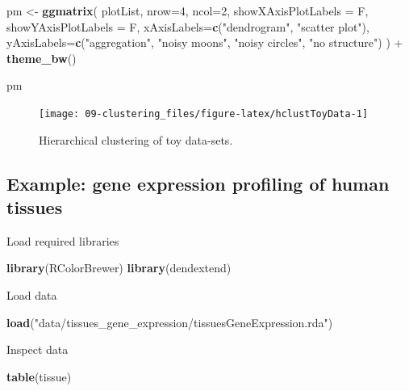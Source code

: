 \documentclass[]{book}
\newenvironment{Shaded}{\begin{snugshade}}{\end{snugshade}}
\newcommand{\KeywordTok}[1]{\textcolor[rgb]{0.13,0.29,0.53}{\textbf{{#1}}}}
\newcommand{\DataTypeTok}[1]{\textcolor[rgb]{0.13,0.29,0.53}{{#1}}}
\newcommand{\DecValTok}[1]{\textcolor[rgb]{0.00,0.00,0.81}{{#1}}}
\newcommand{\StringTok}[1]{\textcolor[rgb]{0.31,0.60,0.02}{{#1}}}
\newcommand{\NormalTok}[1]{{#1}}
\theoremstyle{definition}
\theoremstyle{definition}
\theoremstyle{definition}
\theoremstyle{remark}
\begin{document}
\begin{Shaded}
\begin{Highlighting}[]
\NormalTok{pm <-}\StringTok{ }\KeywordTok{ggmatrix}\NormalTok{(}
  \NormalTok{plotList, }\DataTypeTok{nrow=}\DecValTok{4}\NormalTok{, }\DataTypeTok{ncol=}\DecValTok{2}\NormalTok{, }\DataTypeTok{showXAxisPlotLabels =} \NormalTok{F, }\DataTypeTok{showYAxisPlotLabels =} \NormalTok{F, }\DataTypeTok{xAxisLabels=}\KeywordTok{c}\NormalTok{(}\StringTok{"dendrogram"}\NormalTok{, }\StringTok{"scatter plot"}\NormalTok{), }\DataTypeTok{yAxisLabels=}\KeywordTok{c}\NormalTok{(}\StringTok{"aggregation"}\NormalTok{, }\StringTok{"noisy moons"}\NormalTok{, }\StringTok{"noisy circles"}\NormalTok{, }\StringTok{"no structure"}\NormalTok{)}
\NormalTok{) +}\StringTok{ }\KeywordTok{theme_bw}\NormalTok{()}

\NormalTok{pm}
\end{Highlighting}
\end{Shaded}

\begin{figure}

{\centering \texttt{[image: 09-clustering\_files/figure-latex/hclustToyData-1]} 

}

\caption{Hierarchical clustering of toy data-sets. }\label{fig:hclustToyData}
\end{figure}

\subsection{Example: gene expression profiling of human
tissues}\label{example-gene-expression-profiling-of-human-tissues}

Load required libraries

\begin{Shaded}
\begin{Highlighting}[]
\KeywordTok{library}\NormalTok{(RColorBrewer)}
\KeywordTok{library}\NormalTok{(dendextend)}
\end{Highlighting}
\end{Shaded}

Load data

\begin{Shaded}
\begin{Highlighting}[]
\KeywordTok{load}\NormalTok{(}\StringTok{"data/tissues_gene_expression/tissuesGeneExpression.rda"}\NormalTok{)}
\end{Highlighting}
\end{Shaded}

Inspect data

\begin{Shaded}
\begin{Highlighting}[]
\KeywordTok{table}\NormalTok{(tissue)}
\end{Highlighting}
\end{Shaded}
\end{document}
